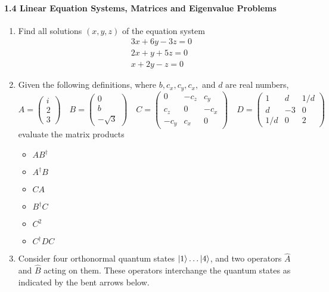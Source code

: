 \documentclass{chem6155problemset}
\begin{document}
\paragraph{1.4 Linear Equation Systems, Matrices and Eigenvalue Problems}

\begin{enumerate}[resume]
	\item Find all solutions $(x,y,z)$ of the equation system
	\[ \begin{array}{ccc} 3 x + 6 y -3 z = 0 \\
	   					  2 x +   y + 5z = 0 \\
						  x   +  2y - z  = 0
       \end{array}
       \]


  \item Given the following definitions, where $b, c_x, c_y, c_x,$ and $d$ are real numbers,
  \[  A=\begin{pmatrix} i \\ 2 \\ 3 \end{pmatrix}  \quad
      B=\begin{pmatrix} 0 \\ b \\ -\sqrt{3} \end{pmatrix} \quad
      C=\begin{pmatrix} 0  & -c_z &  c_y \\ c_z & 0 & -c_x \\ -c_y & c_x & 0 \end{pmatrix} \quad
      D=\begin{pmatrix} 1  & d &  1/d \\ d & -3 & 0 \\  1/d & 0 & 2 \end{pmatrix}
  \]
  evaluate the matrix products
     \begin{itemize}
        \item $AB^\dagger$
        \item $A^\dagger B$
        \item $CA$
        \item $B^\dagger C$
        \item $C^2$
        \item $C^\dagger D C$
     \end{itemize}
	\item Consider four orthonormal quantum states $|{1}\rangle \dots |{4}\rangle$, and two operators $\hat A$ and $\hat B$ acting on them. These operators interchange the quantum states as indicated by the bent arrows below.


\end{enumerate}
\end{document}
